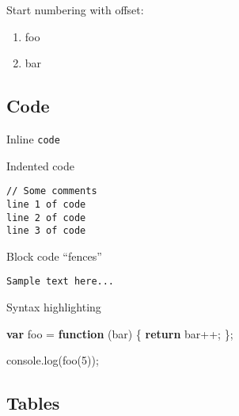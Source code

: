 \documentclass[]{article}
\newenvironment{Shaded}{}{}
\newcommand{\KeywordTok}[1]{\textcolor[rgb]{0.00,0.44,0.13}{\textbf{{#1}}}}
\newcommand{\DecValTok}[1]{\textcolor[rgb]{0.25,0.63,0.44}{{#1}}}
\newcommand{\VariableTok}[1]{\textcolor[rgb]{0.10,0.09,0.49}{{#1}}}
\newcommand{\ControlFlowTok}[1]{\textcolor[rgb]{0.00,0.44,0.13}{\textbf{{#1}}}}
\newcommand{\OperatorTok}[1]{\textcolor[rgb]{0.40,0.40,0.40}{{#1}}}
\newcommand{\AttributeTok}[1]{\textcolor[rgb]{0.49,0.56,0.16}{{#1}}}
\newcommand{\NormalTok}[1]{{#1}}
\providecommand{\tightlist}{%
  \setlength{\itemsep}{0pt}\setlength{\parskip}{0pt}}
\begin{document}
Start numbering with offset:

\begin{enumerate}
\def\labelenumi{\arabic{enumi}.}
\setcounter{enumi}{56}
\tightlist
\item
  foo
\item
  bar
\end{enumerate}

\subsection{Code}\label{code}

Inline \texttt{code}

Indented code

\begin{verbatim}
// Some comments
line 1 of code
line 2 of code
line 3 of code
\end{verbatim}

Block code ``fences''

\begin{verbatim}
Sample text here...
\end{verbatim}

Syntax highlighting

\begin{Shaded}
\begin{Highlighting}[]
\KeywordTok{var} \NormalTok{foo }\OperatorTok{=} \KeywordTok{function} \NormalTok{(bar) }\OperatorTok{\{}
  \ControlFlowTok{return} \NormalTok{bar}\OperatorTok{++;}
\OperatorTok{\};}

\VariableTok{console}\NormalTok{.}\AttributeTok{log}\NormalTok{(}\AttributeTok{foo}\NormalTok{(}\DecValTok{5}\NormalTok{))}\OperatorTok{;}
\end{Highlighting}
\end{Shaded}

\subsection{Tables}\label{tables}
\end{document}
